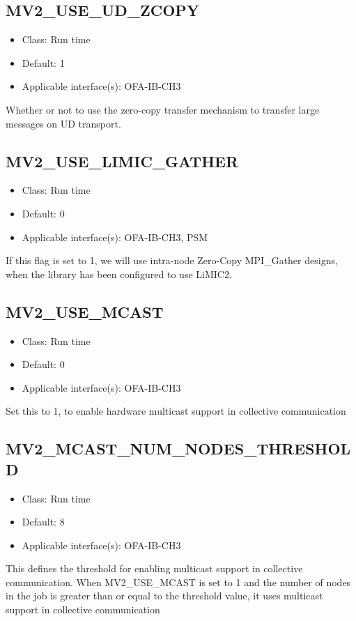 \subsection{MV2\_USE\_UD\_ZCOPY}
\label{def:ud-zcopy}

\begin{itemize}
        \item Class: Run time
        \item Default: 1
        \item Applicable interface(s): OFA-IB-CH3
\end{itemize}
Whether or not to use the zero-copy transfer mechanism to transfer large messages on UD transport.

\subsection{MV2\_USE\_LIMIC\_GATHER}
\label{def:use-limic-gather}

\begin{itemize}
        \item Class: Run time
        \item Default: 0
    \item Applicable interface(s): OFA-IB-CH3, PSM
\end{itemize}
If this flag is set to 1, we will use intra-node Zero-Copy MPI\_Gather designs, when 
the library has been configured to use LiMIC2. 


\subsection{MV2\_USE\_MCAST}
\label{def:use-mcast}
\begin{itemize}
        \item Class: Run time
        \item Default: 0
        \item Applicable interface(s): OFA-IB-CH3
\end{itemize}
Set this to 1, to enable hardware multicast support in collective communication

\subsection{MV2\_MCAST\_NUM\_NODES\_THRESHOLD}
\label{def:mcast-num-nodes-thrshold}
\begin{itemize}
        \item Class: Run time
        \item Default: 8
        \item Applicable interface(s): OFA-IB-CH3
\end{itemize}
This defines the threshold for enabling multicast support in collective communication. 
When MV2\_USE\_MCAST is set to 1 and the number of nodes in the job is greater than or 
equal to the threshold value, it uses multicast support in collective communication

